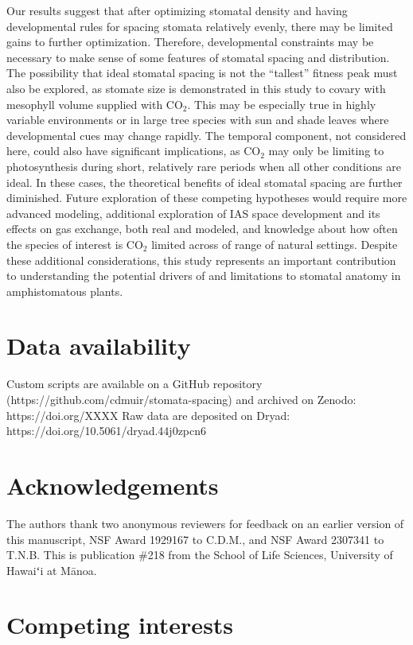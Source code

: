 \documentclass[webpdf,large,modern,unnumsec,namedate]{oup-authoring-template}
\begin{document}
Our results suggest that after optimizing stomatal density and having
developmental rules for spacing stomata relatively evenly, there may be
limited gains to further optimization. Therefore, developmental
constraints may be necessary to make sense of some features of stomatal
spacing and distribution. The possibility that ideal stomatal spacing is
not the ``tallest'' fitness peak must also be explored, as stomate size
is demonstrated in this study to covary with mesophyll volume supplied
with CO\(_2\). This may be especially true in highly variable
environments or in large tree species with sun and shade leaves where
developmental cues may change rapidly. The temporal component, not
considered here, could also have significant implications, as CO\(_2\)
may only be limiting to photosynthesis during short, relatively rare
periods when all other conditions are ideal. In these cases, the
theoretical benefits of ideal stomatal spacing are further diminished.
Future exploration of these competing hypotheses would require more
advanced modeling, additional exploration of IAS space development and
its effects on gas exchange, both real and modeled, and knowledge about
how often the species of interest is CO\(_2\) limited across of range of
natural settings. Despite these additional considerations, this study
represents an important contribution to understanding the potential
drivers of and limitations to stomatal anatomy in amphistomatous plants.

\section{Data availability}\label{data-availability}

Custom scripts are available on a GitHub repository
(https://github.com/cdmuir/stomata-spacing) and archived on Zenodo:
https://doi.org/XXXX Raw data are deposited on Dryad:
https://doi.org/10.5061/dryad.44j0zpcn6

\section{Acknowledgements}\label{acknowledgements}

The authors thank two anonymous reviewers for feedback on an earlier
version of this manuscript, NSF Award 1929167 to C.D.M., and NSF Award
2307341 to T.N.B. This is publication \#218 from the School of Life
Sciences, University of Hawaiʻi at Mānoa.

\section{Competing interests}
\end{document}
